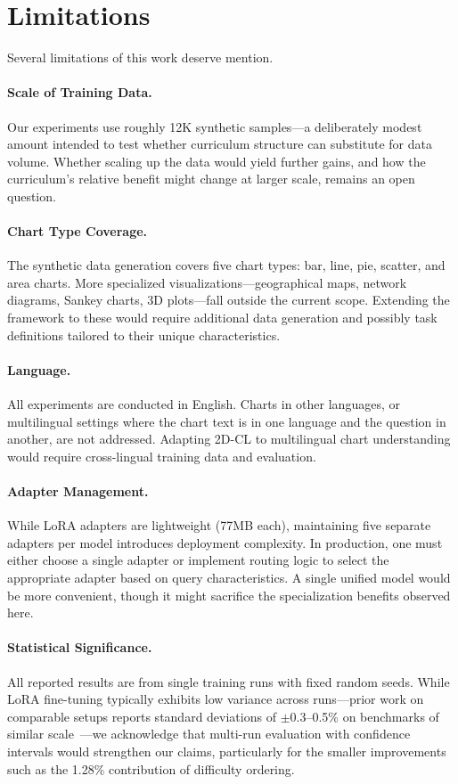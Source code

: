 \documentclass[journal]{IEEEtran}
\newcommand{\method}{2D-CL}
\begin{document}
\section*{Limitations}
Several limitations of this work deserve mention.

\paragraph{Scale of Training Data.}
Our experiments use roughly 12K synthetic samples---a deliberately modest amount intended to test whether curriculum structure can substitute for data volume. Whether scaling up the data would yield further gains, and how the curriculum's relative benefit might change at larger scale, remains an open question.

\paragraph{Chart Type Coverage.}
The synthetic data generation covers five chart types: bar, line, pie, scatter, and area charts. More specialized visualizations---geographical maps, network diagrams, Sankey charts, 3D plots---fall outside the current scope. Extending the framework to these would require additional data generation and possibly task definitions tailored to their unique characteristics.

\paragraph{Language.}
All experiments are conducted in English. Charts in other languages, or multilingual settings where the chart text is in one language and the question in another, are not addressed. Adapting \method{} to multilingual chart understanding would require cross-lingual training data and evaluation.

\paragraph{Adapter Management.}
While LoRA adapters are lightweight (77MB each), maintaining five separate adapters per model introduces deployment complexity. In production, one must either choose a single adapter or implement routing logic to select the appropriate adapter based on query characteristics. A single unified model would be more convenient, though it might sacrifice the specialization benefits observed here.

\paragraph{Statistical Significance.}
All reported results are from single training runs with fixed random seeds. While LoRA fine-tuning typically exhibits low variance across runs---prior work on comparable setups reports standard deviations of $\pm$0.3--0.5\% on benchmarks of similar scale~\cite{hu2022lora}---we acknowledge that multi-run evaluation with confidence intervals would strengthen our claims, particularly for the smaller improvements such as the 1.28\% contribution of difficulty ordering.
\end{document}
